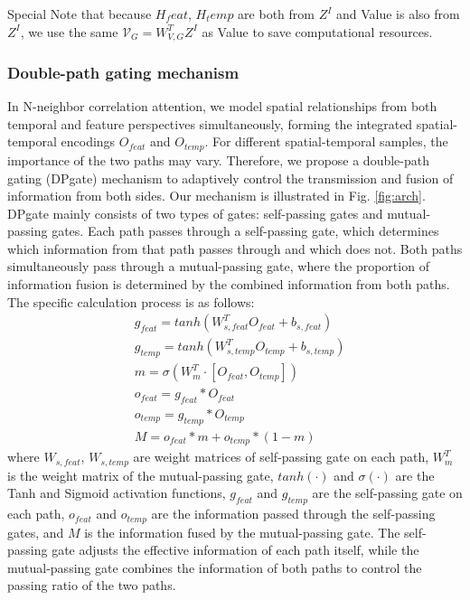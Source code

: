 Special Note that because $H_feat$, $H_temp$ are both from $Z^{I}$ and Value is also from $Z^{I}$, we use the same $\mathcal{V}_{G}= {W_{V,G}^{T}{Z^{I}}}$ as Value to save computational resources.
\subsubsection{Double-path gating mechanism}
In N-neighbor correlation attention, we model spatial relationships from both temporal and feature perspectives simultaneously, forming the integrated spatial-temporal encodings $O_{feat}$ and $O_{temp}$. For different spatial-temporal samples, the importance of the two paths may vary. Therefore, we propose a double-path gating (DPgate) mechanism to adaptively control the transmission and fusion of information from both sides. Our mechanism is illustrated in Fig. \ref{fig:arch}. DPgate mainly consists of two types of gates: self-passing gates and mutual-passing gates. Each path passes through a self-passing gate, which determines which information from that path passes through and which does not. Both paths simultaneously pass through a mutual-passing gate, where the proportion of information fusion is determined by the combined information from both paths. The specific calculation process is as follows:
\begin{equation}
    \begin{split}
        &g_{feat} = tanh(W_{s,feat}^TO_{feat}+b_{s,feat})\\
        &g_{temp} = tanh(W_{s,temp}^TO_{temp}+b_{s,temp})\\
        &m = \sigma(W_m^{T}\cdot[O_{feat},O_{temp}])\\
        &o_{feat}=g_{feat}*O_{feat}\\
        &o_{temp}=g_{temp}*O_{temp}\\
        &M=o_{feat}*m+o_{temp}*(1-m)
    \end{split}
\end{equation}
where $W_{s,feat}$, $W_{s,temp}$ are weight matrices of self-passing gate on each path, $W_m^{T}$ is the weight matrix of the mutual-passing gate, $tanh(\cdot)$ and $\sigma(\cdot)$ are the Tanh and Sigmoid activation functions, $g_{feat}$ and $g_{temp}$ are the self-passing gate on each path, $o_{feat}$ and $o_{temp}$ are the information passed through the self-passing gates, and $M$ is the information fused by the mutual-passing gate. The self-passing gate adjusts the effective information of each path itself, while the mutual-passing gate combines the information of both paths to control the passing ratio of the two paths.

